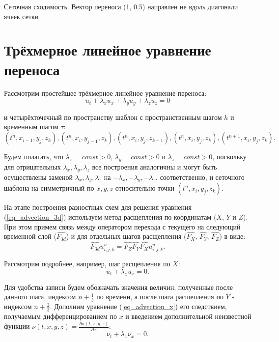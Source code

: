 \documentclass[11pt]{article}
\begin{document}
\begin{table}
\caption {Сеточная сходимость. Вектор переноса (1, 0.5) направлен не вдоль диагонали ячеек сетки} \label{tab_convergence_nondiagonal_2d}
\bigskip

\end{table}

\section{Трёхмерное линейное уравнение переноса}

Рассмотрим простейшее трёхмерное линейное уравнение переноса:
\begin{equation}
\label{eq_advection_3d}
u_t + \lambda_x u_x + \lambda_y u_y + \lambda_z u_z = 0
\end{equation}

и четырёхточечный по пространству шаблон с пространственным шагом $h$ и временным шагом $\tau$:
\begin{equation}
\label{eq_stencil_4}
(t^n, x_{i - 1}, y_j, z_k), (t^n, x_i, y_{j - 1}, z_k), (t^n, x_i, y_j, z_{k - 1}), (t^n, x_i, y_j, z_k), (t^{n + 1}, x_i, y_j, z_k).
\end{equation}

Будем полагать, что $\lambda_x = const > 0$, $\lambda_y = const > 0$ и $\lambda_z = const > 0$, поскольку для отрицательных $\lambda_x, \lambda_y, \lambda_z$ все построения аналогичны и могут быть осуществлены заменой $\lambda_x, \lambda_y, \lambda_z$ на $-\lambda_x, -\lambda_y, -\lambda_z$, соответственно, и сеточного шаблона на симметричный по $x, y, z$ относительно точки $(t^n, x_i, y_j, z_k)$.

На этапе построения разностных схем для решения уравнения (\ref{eq_advection_3d}) используем метод расщепления по координатам ($X$, $Y$ и $Z$).
При этом примем связь между оператором перехода с текущего на следующий временной слой ($\hat{F_{3d}}$)
 и для отдельных шагов расщепления ($\hat{F_X}$, $\hat{F_Y}$, $\hat{F_Z}$) в виде:
\begin{equation}
\label{eq_operators}
\hat{F_{3d}} u^n_{i,j,k} = \hat{F_Z} \hat{F_Y} \hat{F_X} u^n_{i,j,k}.
\end{equation}

Рассмотрим подробнее, например, шаг расщепления по $X$:
\begin{equation}
\label{eq_advection_x}
u_t + \lambda_x u_x = 0.
\end{equation}

Для удобства записи будем обозначать значения величин, полученные после данного шага, индексом $n + \frac{1}{3}$ по времени, а после шага расшепления по $Y$ - индексом $n + \frac{2}{3}$.
Дополним уравнение (\ref{eq_advection_x}) его следствием, получаемым дифференцированием по $x$ и введением дополнительной неизвестной функции $\nu(t, x, y, z) = \frac{\partial u(t, x, y, z)}{\partial x}$:
\begin{equation}
\label{eq_advection_x_ext}
\nu_t + \lambda_x \nu_x = 0.
\end{equation}
\end{document}
